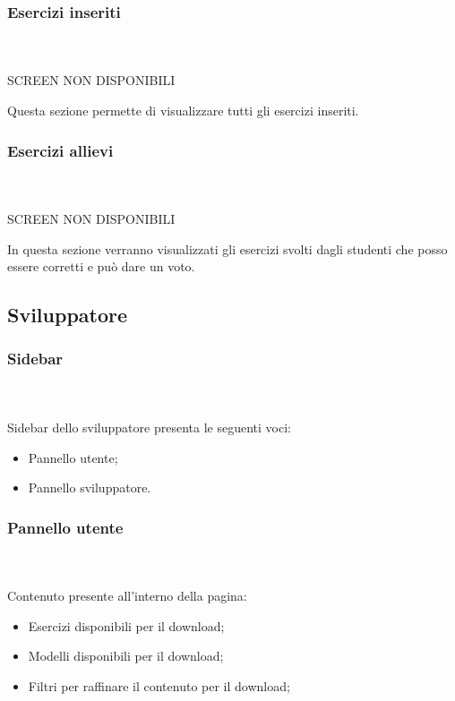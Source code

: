         
        
        \subsubsection{Esercizi inseriti}\mbox{}\\ \\
        SCREEN NON DISPONIBILI
        
          Questa sezione permette di visualizzare tutti gli esercizi inseriti.
        
        
        
        
        \subsubsection{Esercizi allievi}\mbox{}\\ \\
        SCREEN NON DISPONIBILI
        
          In questa sezione verranno visualizzati gli esercizi svolti dagli studenti che posso essere corretti e può dare un voto.
        
        
        
        
	\newpage
    \subsection{Sviluppatore}
    
    	\subsubsection{Sidebar}\mbox{} \\ \\
    	  Sidebar dello sviluppatore presenta le seguenti voci:
    		\begin{itemize}
    		\item Pannello utente;
    		\item Pannello sviluppatore.
    		\end{itemize}
    
    
    
    
    	\subsubsection{Pannello utente}\mbox{}\\ \\
    	  Contenuto presente all'interno della pagina:
        	\begin{itemize} 
        	\item Esercizi disponibili per il download;
        	\item Modelli disponibili per il download;
        	\item Filtri per raffinare il contenuto per il download;
        	\end{itemize}




